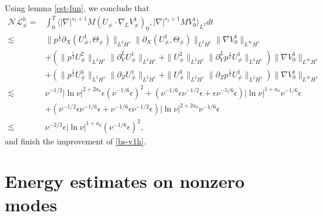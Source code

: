 \documentclass[12pt]{article}
\newcommand{\wtb}{\langle\partial_Z\rangle }
\numberwithin{equation}{section}
\begin{document}
   	Using lemma \ref{est-fun}, we conclude that 
   	\begin{align*}
   		\mathcal{NL}^h_{\neq}=&\int_{0}^{T}\langle |\nabla|^{s_1+1} M (U_{\neq}\cdot\nabla_L V^1_{\neq})_0,  |\nabla|^{s_1+1} M V^1_0\rangle_{L^2} dt\\
   		\lesssim&\|p^{\frac{1}{2}}\partial_X(U^1_{\neq},\Theta_{\neq})\|_{L^2H^s} \|\partial_X(U^1_{\neq},\Theta_{\neq})\|_{L^2H^s}\|\nabla V^1_0\|_{L^\infty H^s}\\
   		&+(\|p^{\frac{1}{2}}U^2_{\neq}\|_{L^2H^s} \|\partial_Y^LU^1_{\neq}\|_{L^2H^s}+\|U^2_{\neq}\|_{L^2H^s}\|\partial_Y^L p^{\frac{1}{2}}U^1_{\neq}\|_{L^2H^s})\|\nabla  V^1_0\|_{L^\infty H^s}\\
   		&+(\|p^{\frac{1}{2}}U^3_{\neq}\|_{L^2H^s} \|\partial_ZU^1_{\neq}\|_{L^2H^s}+\|U^3_{\neq}\|_{L^2H^s}\|\partial_Z p^{\frac{1}{2}}U^1_{\neq}\|_{L^2H^s})\|\nabla  V^1_0\|_{L^\infty H^s}\\
   		\lesssim&\nu^{-1/2} |\ln{\nu}|^{2+2a_0} \epsilon(\nu^{-1/6}\epsilon)^2+(\nu^{-1/6}\epsilon\nu^{-1/2}\epsilon+\epsilon\nu^{-5/6}\epsilon)|\ln{\nu}|^{1+a_0} \nu^{-1/6}\epsilon\\
        &+  (\nu^{-1/2}\epsilon\nu^{-1/6}\epsilon+\nu^{-1/6}\epsilon\nu^{-1/2}\epsilon ) |\ln{\nu}|^{2+2a_0}  \nu^{-1/6}\epsilon\\
   		\lesssim&\nu^{-2/3} \epsilon|\ln{\nu}|^{1+a_0} (\nu^{-1/6}\epsilon)^2,
   	\end{align*}
   	and finish the improvement of \eqref{bs-v1h}.
    
	\section{Energy estimates on nonzero modes}
\end{document}

